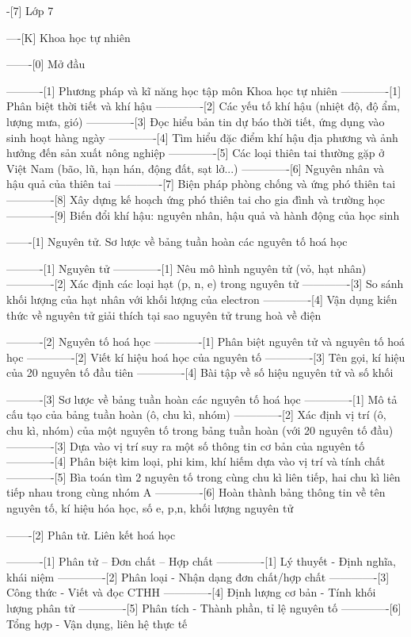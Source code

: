 -[7] Lớp 7

----[K] Khoa học tự nhiên

-------[0] Mở đầu

----------[1] Phương pháp và kĩ năng học tập môn Khoa học tự nhiên
-------------[1] Phân biệt thời tiết và khí hậu
-------------[2] Các yếu tố khí hậu (nhiệt độ, độ ẩm, lượng mưa, gió)
-------------[3] Đọc hiểu bản tin dự báo thời tiết, ứng dụng vào sinh hoạt hàng ngày
-------------[4] Tìm hiểu đặc điểm khí hậu địa phương và ảnh hưởng đến sản xuất nông nghiệp
-------------[5] Các loại thiên tai thường gặp ở Việt Nam (bão, lũ, hạn hán, động đất, sạt lở...)
-------------[6] Nguyên nhân và hậu quả của thiên tai
-------------[7] Biện pháp phòng chống và ứng phó thiên tai
-------------[8] Xây dựng kế hoạch ứng phó thiên tai cho gia đình và trường học
-------------[9] Biến đổi khí hậu: nguyên nhân, hậu quả và hành động của học sinh

-------[1] Nguyên tử. Sơ lược về bảng tuần hoàn các nguyên tố hoá học

----------[1] Nguyên tử
-------------[1] Nêu mô hình nguyên tử (vỏ, hạt nhân)
-------------[2] Xác định các loại hạt (p, n, e) trong nguyên tử
-------------[3] So sánh khối lượng của hạt nhân với khối lượng của electron
-------------[4] Vận dụng kiến thức về nguyên tử giải thích tại sao nguyên tử trung hoà về điện

----------[2] Nguyên tố hoá học
-------------[1] Phân biệt nguyên tử và nguyên tố hoá học
-------------[2] Viết kí hiệu hoá học của nguyên tố
-------------[3] Tên gọi, kí hiệu của 20 nguyên tố đầu tiên
-------------[4] Bài tập về số hiệu nguyên tử và số khối

----------[3] Sơ lược về bảng tuần hoàn các nguyên tố hoá học
-------------[1] Mô tả cấu tạo của bảng tuần hoàn (ô, chu kì, nhóm)
-------------[2] Xác định vị trí (ô, chu kì, nhóm) của một nguyên tố trong bảng tuần hoàn (với 20 nguyên tố đầu)
-------------[3] Dựa vào vị trí suy ra một số thông tin cơ bản của nguyên tố
-------------[4] Phân biệt kim loại, phi kim, khí hiếm dựa vào vị trí và tính chất
-------------[5] Bìa toán tìm 2 nguyên tố trong cùng chu kì liên tiếp, hai chu kì liên tiếp nhau trong cùng nhóm A
-------------[6] Hoàn thành bảng thông tin về tên nguyên tố, kí hiệu hóa học, số e, p,n, khối lượng nguyên tử

-------[2] Phân tử. Liên kết hoá học

----------[1] Phân tử – Đơn chất – Hợp chất
-------------[1] Lý thuyết - Định nghĩa, khái niệm
-------------[2] Phân loại - Nhận dạng đơn chất/hợp chất
-------------[3] Công thức - Viết và đọc CTHH
-------------[4] Định lượng cơ bản - Tính khối lượng phân tử
-------------[5] Phân tích - Thành phần, tỉ lệ nguyên tố
-------------[6] Tổng hợp - Vận dụng, liên hệ thực tế

